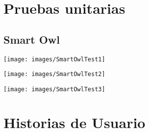 \iffalse
\newpage
\section*{Pruebas unitarias}
\subsection*{Smart Owl}
\begin{center}
  \texttt{[image: images/SmartOwlTest1]}
\end{center}

\begin{center}
  \texttt{[image: images/SmartOwlTest2]}
\end{center}

\begin{center}
  \texttt{[image: images/SmartOwlTest3]}
\end{center}
%
%
\newpage
\section*{Historias de Usuario}
